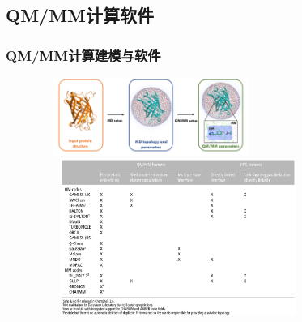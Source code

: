 \subsection{\rm{QM/MM}计算软件}
\frame
{
	\frametitle{\textrm{QM/MM}计算建模与软件}
\begin{figure}[h!]
\centering
\vspace{-13.0pt}
\includegraphics[height=1.00in,width=2.90in,viewport=0 20 920 375,clip]{Figures/QM-MM_modeling.png}
\includegraphics[height=2.00in,width=3.60in,viewport=0 0 1250 820,clip]{Figures/QM-MM-softwares.png}
\label{QM/MM-Modeling}
\end{figure}
}

